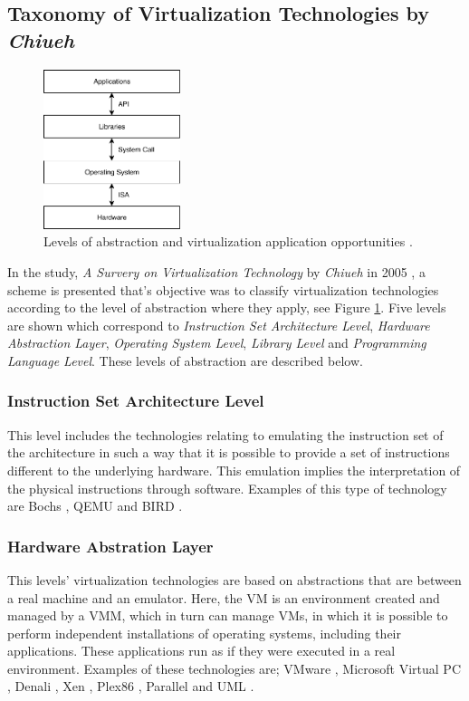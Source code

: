 	\subsection{Taxonomy of Virtualization Technologies by \textit{Chiueh}}
	\begin{figure}[H]
		\centering
		\includegraphics[width=4cm]{images/Chiueh2005.pdf}
		\vspace{-0.2cm}
		\caption{Levels of abstraction and virtualization application opportunities \cite{Chiueh2005}.}
		\label{fig:VirtualizationOpportunities}
	\end{figure}
	
	In the study, \textit{A Survery on Virtualization Technology} by \textit{Chiueh} in 2005 \cite{Chiueh2005}, a scheme is presented that's objective was to classify virtualization technologies according to the level of abstraction where they apply, see Figure \ref{fig:VirtualizationOpportunities}. Five levels are shown which correspond to \textit{Instruction Set Architecture Level}, \textit{Hardware Abstraction Layer}, \textit{Operating System Level}, \textit{Library Level} and \textit{Programming Language Level}. These levels of abstraction are described below.
	
	\subsubsection{Instruction Set Architecture Level} 
	This level includes the technologies relating to emulating the instruction set of the architecture in such a way that it is possible to provide a set of instructions different to the underlying hardware. This emulation implies the interpretation of the physical instructions through software. Examples of this type of technology are Bochs \cite{Bochs2018}, QEMU \cite {QEMU2018} and BIRD \cite {Nanda2006}.
	
	\subsubsection{Hardware Abstration Layer}
	This levels' virtualization technologies are based on abstractions that are between a real machine and an emulator. Here, the VM is an environment created and managed by a VMM, which in turn can manage VMs, in which it is possible to perform independent installations of operating systems, including their applications. These applications run as if they were executed in a real environment. Examples of these technologies are; VMware \cite{VMware2018Website}, Microsoft Virtual PC \cite{Honeycutt2003}, Denali \cite {Whitaker2002}, Xen \cite{Xen2018Website, Barham2003, Xen2018WebsiteCambridge}, Plex86 \cite{Plex86}, Parallel \cite{Parallels2018} and UML \cite{Dike2006, UML2006Website}. 
	
